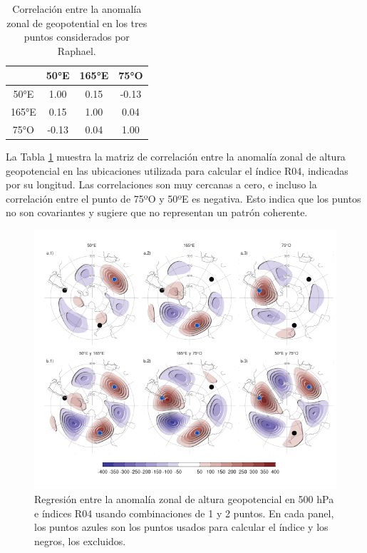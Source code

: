 \documentclass[12pt,oneside]{reedthesis}
\begin{document}
\begin{table}

\caption{\label{tab:raphael-correlation}Correlación entre la anomalía zonal de geopotential en los tres puntos considerados por Raphael.}
\centering
\begin{tabular}[t]{cccc}
\toprule
 & 50°E & 165°E & 75°O\\
\midrule
50°E & 1.00 & 0.15 & -0.13\\
165°E & 0.15 & 1.00 & 0.04\\
75°O & -0.13 & 0.04 & 1.00\\
\bottomrule
\end{tabular}
\end{table}

La Tabla \ref{tab:raphael-correlation} muestra la matriz de correlación entre la anomalía zonal de altura geopotencial en las ubicaciones utilizada para calcular el índice R04, indicadas por su longitud.
Las correlaciones son muy cercanas a cero, e incluso la correlación entre el punto de 75ºO y 50ºE es negativa.
Esto indica que los puntos no son covariantes y sugiere que no representan un patrón coherente.

\begin{figure}
\includegraphics{figures/15-onda3/cor-puntos-1} \caption{Regresión entre la anomalía zonal de altura geopotencial en 500 hPa e índices R04 usando combinaciones de 1 y 2 puntos. En cada panel, los puntos azules son los puntos usados para calcular el índice y los negros, los excluidos.}\label{fig:cor-puntos}
\end{figure}
\end{document}
